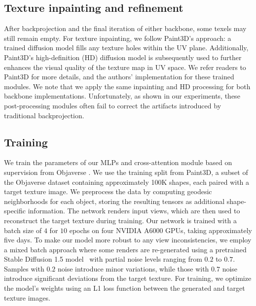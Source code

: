 \subsection{Texture inpainting and refinement}
After backprojection and the final iteration of either backbone, some texels may still remain empty. For 
texture inpainting, we follow Paint3D's approach: a trained diffusion model fills any texture holes 
within the UV plane. Additionally, Paint3D's high-definition (HD) diffusion model is subsequently used 
to further enhances the visual quality of the texture map in UV space. We refer readers to Paint3D 
\cite{Zeng:2024:Paint3D} for more details, and the authors' implementation for these trained modules.
We note that we apply the same inpainting and HD processing for both backbone implementations. 
Unfortunately, as shown in our experiments, these post-processing modules often fail to correct the 
artifacts introduced by traditional backprojection.

\subsection{Training}
\label{sec:training}
We train the parameters of our MLPs and cross-attention module based on supervision from 
Objaverse \cite{Deitke:2023:Objaverse}. We use the training split from Paint3D, a subset of 
the Objaverse dataset containing approximately 100K shapes, each paired with a target 
texture image. We preprocess the data by computing geodesic neighborhoods for each object, 
storing the resulting tensors as additional shape-specific information.
The network renders input views, which are then used to reconstruct the target texture 
during training.  Our network is trained with a 
batch size of $4$ for $10$ epochs on four NVIDIA A6000 GPUs, taking approximately five days. 
To make our model more robust to any view inconsistencies,
we employ a mixed batch approach where some renders are re-generated using a pretrained 
Stable Diffusion 1.5 model~\cite{Rombach:2022:High} with partial noise levels ranging from 
$0.2$ to $0.7$. Samples with $0.2$ noise introduce minor variations, while those with $0.7$ 
noise introduce significant deviations from the target texture. For training, we optimize 
the model’s weights using an L1 loss function between the generated and target texture 
images. \vspace*{-4mm}

